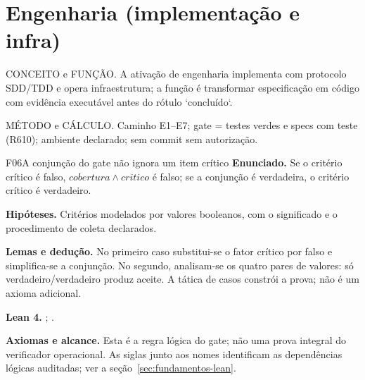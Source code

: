 \section{Engenharia (implementação e infra)}
\begin{descricao}
CONCEITO e FUNÇÃO. A ativação de engenharia implementa com protocolo SDD/TDD e
opera infraestrutura; a função é transformar especificação em código com
evidência executável antes do rótulo `concluído`.
\end{descricao}
\begin{metodo}
MÉTODO e CÁLCULO. Caminho E1--E7; gate = testes verdes e specs com teste
(R610); ambiente declarado; sem commit sem autorização.
\end{metodo}
\begin{formalizacao}{F06}{A conjunção do gate não ignora um item crítico}
\textbf{Enunciado.} Se o critério crítico é falso, $cobertura\land critico$ é falso; se a conjunção é verdadeira, o critério crítico é verdadeiro.

\textbf{Hipóteses.} Critérios modelados por valores booleanos, com o significado e o procedimento de coleta declarados.

\textbf{Lemas e dedução.} No primeiro caso substitui-se o fator crítico por falso e simplifica-se a conjunção. No segundo, analisam-se os quatro pares de valores: só verdadeiro/verdadeiro produz aceite. A tática de casos constrói a prova; não é um axioma adicional.

\textbf{Lean 4.} ; .

\textbf{Axiomas e alcance.} Esta é a regra lógica do gate; não uma prova integral do verificador operacional. As siglas junto aos nomes identificam as dependências lógicas auditadas; ver a seção~\ref{sec:fundamentos-lean}.
\end{formalizacao}

